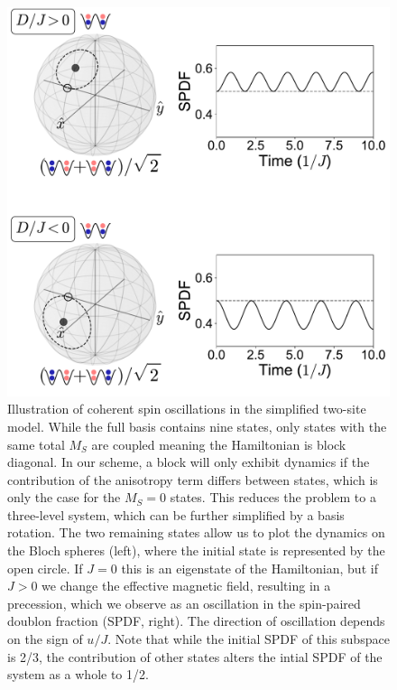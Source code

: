 \documentclass[aps,prl,twocolumn,superscriptaddress]{revtex4-1}
\begin{document}
\begin{figure}
    \centering
    \includegraphics[width=\columnwidth]{figs/two-site-cartoon/two-site-heisenberg-min-graphical.pdf}
    \caption{Illustration of coherent spin oscillations in the simplified two-site model. While the full basis contains nine states, only states with the same total $M_S$ are coupled meaning the Hamiltonian is block diagonal. In our scheme, a block will only exhibit dynamics if the contribution of the anisotropy term differs between states, which is only the case for the $M_S = 0$ states. This reduces the problem to a three-level system, which can be further simplified by a basis rotation. The two remaining states allow us to plot the dynamics on the Bloch spheres (left), where the initial state is represented by the open circle. If $J = 0$ this is an eigenstate of the Hamiltonian, but if $J > 0$ we change the effective magnetic field, resulting in a precession, which we observe as an oscillation in the spin-paired doublon fraction (SPDF, right). The direction of oscillation depends on the sign of $u/J$. Note that while the initial SPDF of this subspace is 2/3, the contribution of other states alters the intial SPDF of the system as a whole to 1/2.}
    \label{fig:two-site-cartoon}
\end{figure}
\end{document}

